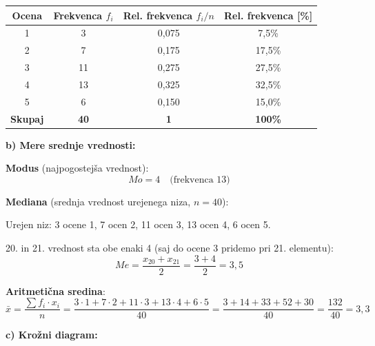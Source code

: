 \documentclass[a4paper,12pt]{article}
\begin{document}
\vspace{0.3cm}
\begin{center}
\renewcommand{\arraystretch}{1.5}
\begin{tabular}{|c|c|c|c|}
\hline
\textbf{Ocena} & \textbf{Frekvenca} $f_i$ & \textbf{Rel. frekvenca} $f_i/n$ & \textbf{Rel. frekvenca [\%]} \\
\hline
1 & 3  & 0{,}075 & 7{,}5\% \\
\hline
2 & 7  & 0{,}175 & 17{,}5\% \\
\hline
3 & 11 & 0{,}275 & 27{,}5\% \\
\hline
4 & 13 & 0{,}325 & 32{,}5\% \\
\hline
5 & 6  & 0{,}150 & 15{,}0\% \\
\hline
\textbf{Skupaj} & \textbf{40} & \textbf{1} & \textbf{100\%} \\
\hline
\end{tabular}
\end{center}

\vspace{0.5cm}

\textbf{b) Mere srednje vrednosti:}

\textbf{Modus} (najpogostejša vrednost):
\[
Mo = 4 \quad \text{(frekvenca 13)}
\]

\textbf{Mediana} (srednja vrednost urejenega niza, $n=40$):

Urejen niz: 3 ocene 1, 7 ocen 2, 11 ocen 3, 13 ocen 4, 6 ocen 5.

20. in 21. vrednost sta obe enaki 4 (saj do ocene 3 pridemo pri 21. elementu):
\[
Me = \frac{x_{20}+x_{21}}{2} = \frac{3+4}{2} = 3{,}5
\]

\textbf{Aritmetična sredina}:
\[
\bar{x} = \frac{\sum f_i \cdot x_i}{n}
= \frac{3\cdot1 + 7\cdot2 + 11\cdot3 + 13\cdot4 + 6\cdot5}{40}
= \frac{3+14+33+52+30}{40}
= \frac{132}{40} = 3{,}3
\]

\vspace{0.5cm}

\textbf{c) Krožni diagram:}
\end{document}
